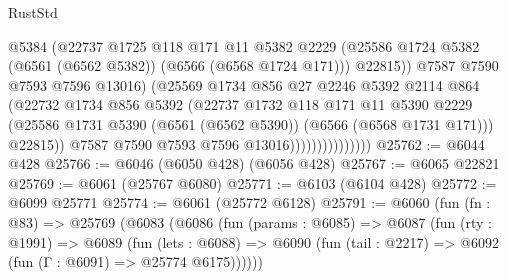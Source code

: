 \begin{lexlean}{RustStd}
\begin{coremodule}
                                    @5384
                                    (@22737
                                      @1725
                                      @118
                                      @171
                                      @11
                                      @5382
                                      @2229
                                      (@25586
                                        @1724
                                        @5382
                                        (@6561 (@6562 @5382))
                                        (@6566 (@6568 @1724 @171)))
                                      @22815))
                                  @7587
                                  @7590
                                  @7593
                                  @7596
                                  @13016)
                                (@25569
                                  @1734
                                  @856
                                  @27
                                  @2246
                                  @5392
                                  @2114
                                  @864
                                  (@22732
                                    @1734
                                    @856
                                    @5392
                                    (@22737
                                      @1732
                                      @118
                                      @171
                                      @11
                                      @5390
                                      @2229
                                      (@25586
                                        @1731
                                        @5390
                                        (@6561 (@6562 @5390))
                                        (@6566 (@6568 @1731 @171)))
                                      @22815))
                                  @7587
                                  @7590
                                  @7593
                                  @7596
                                  @13016)))))))))))))))
@25762 := @6044 @428
@25766 := @6046 (@6050 @428) (@6056 @428)
@25767 := @6065 @22821
@25769 := @6061 (@25767 @6080)
@25771 := @6103 (@6104 @428)
@25772 := @6099 @25771
@25774 := @6061 (@25772 @6128)
@25791 := @6060
    (fun (fn : @83) =>
    @25769
      (@6083
        (@6086
          (fun (params : @6085) =>
          @6087
            (fun (rty : @1991) =>
            @6089
              (fun (lets : @6088) =>
              @6090 (fun (tail : @2217) => @6092 (fun (Γ : @6091) => @25774 @6175))))))

\end{coremodule}
\end{lexlean}
